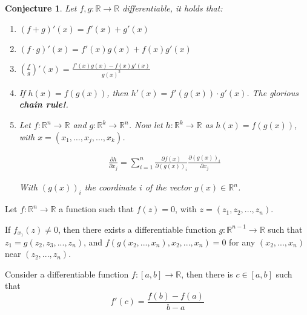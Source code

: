 \documentclass[aspectratio=169]{beamer}
\newtheorem{proposition}{Conjecture}[section]
\begin{document}
\begin{frame}

\begin{proposition}
    Let $f,g:\mathds{R}\rightarrow\mathds{R}$ differentiable, it holds that:
    
    \begin{enumerate}
        \item $(f+g)'(x)=f'(x)+g'(x)$
        \item $(f\cdot g)'(x)=f'(x)g(x)+f(x)g'(x)$
        \item $\left(\frac{f}{g}\right)'(x)=\frac{f'(x)g(x)-f(x)g'(x)}{g(x)^2}$
        \item If $h(x)=f(g(x))$, then $h'(x)=f'(g(x))\cdot g'(x)$. The glorious \textbf{chain rule!}.
        \item Let $f:\mathds{R}^n\rightarrow\mathds{R}$ and $g:\mathds{R}^k\rightarrow\mathds{R}^n$. Now let $h:\mathds{R}^k\rightarrow\mathds{R}$ as $h(x)=f(g(x))$, with $x=(x_1,\ldots, x_j,\ldots, x_k)$.
        
        \begin{align*}
            \frac{\partial h}{\partial x_j} = \sum_{i=1}^n \frac{\partial f(x)}{\partial (g(x))_i}\frac{\partial (g(x))_i}{\partial x_j}
        \end{align*}
        
        With $(g(x))_i$ the coordinate $i$ of the vector $g(x)\in\mathds{R}^n$.
    \end{enumerate}
\end{proposition}
    
\end{frame}

\begin{frame}
    
    \begin{theorem}
        Let $f:\mathds{R}^n\rightarrow\mathds{R}$ a function such that $f(z)=0$, with $z=(z_1,z_2,...,z_n)$. 
        
        If $f_{x_1}(z)\neq 0$, then there exists a differentiable function $g:\mathds{R}^{n-1}\rightarrow\mathds{R}$ such that $z_1=g(z_2,z_3,...,z_n)$, and $f(g(x_2,...,x_n),x_2,...,x_n)=0$ for any $(x_2,...,x_n)$ near $(z_2,...,z_n)$.
    \end{theorem}
    
\end{frame}

\begin{frame}
    
    \begin{theorem}
        Consider a differentiable function $f:[a,b]\rightarrow\mathds{R}$, then there is $c\in[a,b]$ such that $$f'(c)=\frac{f(b)-f(a)}{b-a}$$
    \end{theorem}
    
\end{frame}
\end{document}
